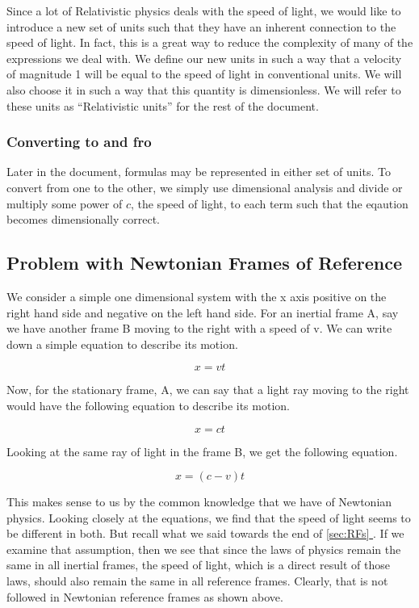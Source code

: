 \documentclass[16pt]{scrartcl}
\newcommand*{\fullref}[1]{\hyperref[{#1}]{\autoref*{#1} \nameref*{#1}}}
\numberwithin{equation}{section}
\theoremstyle{plain}
\theoremstyle{definition}
\begin{document}
Since a lot of Relativistic physics deals with the speed of light, we would like to introduce a new set of units such that they have an inherent connection to the speed of light. In fact, this is a great way to reduce the complexity of many of the expressions we deal with. We define our new units in such a way that a velocity of magnitude 1 will be equal to the speed of light in conventional units. We will also choose it in such a way that this quantity is dimensionless. We will refer to these units as ``Relativistic units'' for the rest of the document.

\subsubsection*{Converting to and fro}

Later in the document, formulas may be represented in either set of units. To convert from one to the other, we simply use dimensional analysis and divide or multiply some power of $c$, the speed of light, to each term such that the eqaution becomes dimensionally correct.

\subsection{Problem with Newtonian Frames of Reference}

We consider a simple one dimensional system with the x axis positive on the right hand side and negative on the left hand side. For an inertial frame A, say we have another frame B moving to the right with a speed of v. We can write down a simple equation to describe its motion.

\begin{equation}
    x = vt
\end{equation}

Now, for the stationary frame, A, we can say that a light ray moving to the right would have the following equation to describe its motion.

\begin{equation}
    x = ct
\end{equation}

Looking at the same ray of light in the frame B, we get the following equation.

\begin{equation}
    x = (c - v)t
\end{equation}

This makes sense to us by the common knowledge that we have of Newtonian physics. Looking closely at the equations, we find that the speed of light seems to be different in both. But recall what we said towards the end of \fullref{sec:RFs}. If we examine that assumption, then we see that since the laws of physics remain the same in all inertial frames, the speed of light, which is a direct result of those laws, should also remain the same in all reference frames. Clearly, that is not followed in Newtonian reference frames as shown above.
\end{document}
